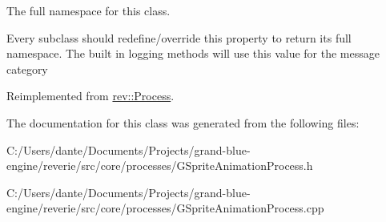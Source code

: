 The full namespace for this class. 

Every subclass should redefine/override this property to return its full namespace. The built in logging methods will use this value for the message category 

Reimplemented from \mbox{\hyperlink{classrev_1_1_process_a7f5a6ab8af65aec3132f6a072b9fcb87}{rev\+::\+Process}}.



The documentation for this class was generated from the following files\+:\begin{DoxyCompactItemize}
\item 
C\+:/\+Users/dante/\+Documents/\+Projects/grand-\/blue-\/engine/reverie/src/core/processes/G\+Sprite\+Animation\+Process.\+h\item 
C\+:/\+Users/dante/\+Documents/\+Projects/grand-\/blue-\/engine/reverie/src/core/processes/G\+Sprite\+Animation\+Process.\+cpp\end{DoxyCompactItemize}
